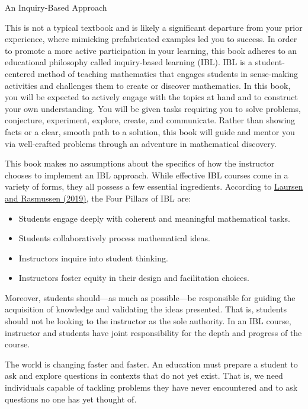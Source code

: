 \begin{section}{An Inquiry-Based Approach}

This is not a typical textbook and is likely a significant departure from your prior experience, where mimicking prefabricated examples led you to success. In order to promote a more active participation in your learning, this book adheres to an educational philosophy called inquiry-based learning (IBL). IBL is a student-centered method of teaching mathematics that engages students in sense-making activities and challenges them to create or discover mathematics.  In this book, you will be expected to actively engage with the topics at hand and to construct your own understanding.  You will be given tasks requiring you to solve problems, conjecture, experiment, explore, create, and communicate.  Rather than showing facts or a clear, smooth path to a solution, this book will guide and mentor you via well-crafted problems through an adventure in mathematical discovery. 

This book makes no assumptions about the specifics of how the instructor chooses to implement an IBL approach. While effective IBL courses come in a variety of forms, they all possess a few essential ingredients. According to \href{https://www.colorado.edu/eer/sites/default/files/attached-files/laursenrasmussencommentaryauthorversion0219.pdf}{Laursen and Rasmussen (2019)}, the Four Pillars of IBL are:
\begin{itemize}
\item Students engage deeply with coherent and meaningful mathematical tasks.
\item Students collaboratively process mathematical ideas.
\item Instructors inquire into student thinking.
\item Instructors foster equity in their design and facilitation choices.
\end{itemize}

Moreover, students should---as much as possible---be responsible for guiding the acquisition of knowledge and validating the ideas presented. That is, students should not be looking to the instructor as the sole authority. In an IBL course, instructor and students have joint responsibility for the depth and progress of the course. 

The world is changing faster and faster. An education must prepare a student to ask and explore questions in contexts that do not yet exist. That is, we need individuals capable of tackling problems they have never encountered and to ask questions no one has yet thought of.


\end{section}
